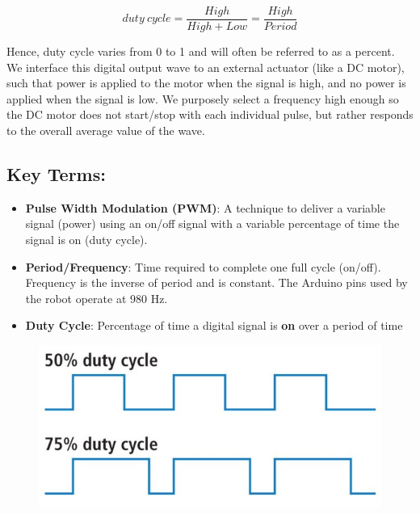 \documentclass{handout}
\begin{document}
	\[
		duty\ cycle = \frac{High}{High + Low} = \frac{High}{Period}
	\]
	
	Hence, duty cycle varies from 0 to 1 and will often be referred to as a percent. We interface this digital output wave to an external actuator (like a DC motor), such that power is applied to the motor when the signal is high, and no power is applied when the signal is low. We purposely select a frequency high enough so the DC motor does not start/stop with each individual pulse, but rather responds to the overall average value of the wave.
	
	\subsection{Key Terms:}
	\begin{itemize}
		\item \textbf{Pulse Width Modulation (PWM)}: A technique to deliver a variable signal (power) using an on/off signal with a variable percentage of time the signal is on (duty cycle).
		\item \textbf{Period/Frequency}: Time required to complete one full cycle (on/off). Frequency is the inverse of period and is constant. The Arduino pins used by the robot operate at 980 Hz.
		\item \textbf{Duty Cycle}: Percentage of time a digital signal is \textbf{on} over a period of time
	\end{itemize}


	
	\begin{figure} [H]
	\centering
	\includegraphics[width=.5\textwidth]{Figure1.PNG}
\end{figure}	
	
\end{document}

